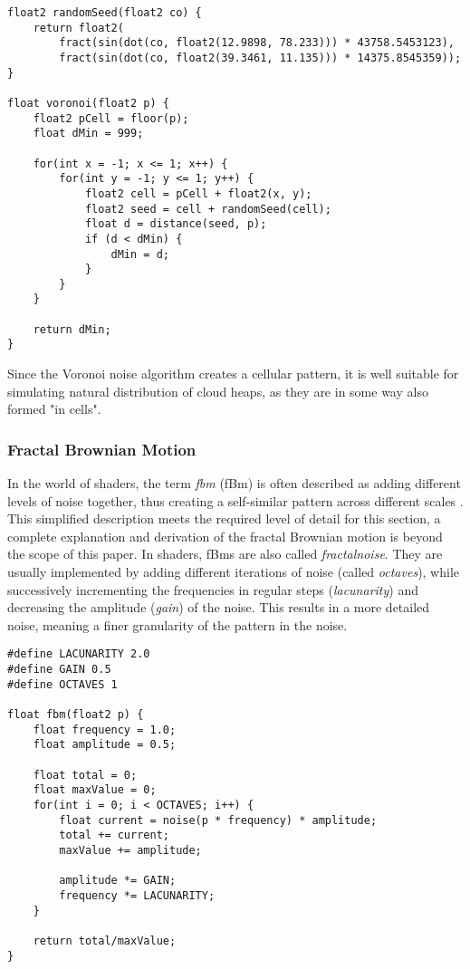 \begin{lstlisting}[language=HLSL, caption=Implementation of 2D Voronoi noise algorithm., label=lst:shader:noise:voronoi2d]
float2 randomSeed(float2 co) {
    return float2(
        fract(sin(dot(co, float2(12.9898, 78.233))) * 43758.5453123),
        fract(sin(dot(co, float2(39.3461, 11.135))) * 14375.8545359));
}

float voronoi(float2 p) {
    float2 pCell = floor(p);
    float dMin = 999;

    for(int x = -1; x <= 1; x++) {
        for(int y = -1; y <= 1; y++) {
            float2 cell = pCell + float2(x, y);
            float2 seed = cell + randomSeed(cell);
            float d = distance(seed, p);
            if (d < dMin) {
                dMin = d;
            }
        }
    }
    
    return dMin;
}
\end{lstlisting}

\noindent
Since the Voronoi noise algorithm creates a cellular pattern, it is well suitable for simulating natural distribution of cloud heaps, as they are in some way also formed "in cells".

\clearpage
\subsubsection{Fractal Brownian Motion}
In the world of shaders, the term \textit{\gls{fbm}} (fBm) is often described as adding different levels of noise together, thus creating a self-similar pattern across different scales \cite{online:thebookofshaders:fractal}.
This simplified description meets the required level of detail for this section, a complete explanation and derivation of the fractal Brownian motion is beyond the scope of this paper.
\emptyline
In shaders, fBms are also called \textit{\gls{fractalnoise}}. They are usually implemented by adding different iterations of noise (called \textit{octaves}), while successively incrementing the frequencies in regular steps (\textit{lacunarity}) and decreasing the amplitude (\textit{gain}) of the noise.
This results in a more detailed noise, meaning a finer granularity of the pattern in the noise.

\begin{lstlisting}[language=HLSL, caption=Implementation of fractal Brownian motion function., label=lst:shader:fbm]
#define LACUNARITY 2.0
#define GAIN 0.5
#define OCTAVES 1
    
float fbm(float2 p) {
    float frequency = 1.0;
    float amplitude = 0.5;
    
    float total = 0;
    float maxValue = 0;
    for(int i = 0; i < OCTAVES; i++) {
        float current = noise(p * frequency) * amplitude;
        total += current;
        maxValue += amplitude;
        
        amplitude *= GAIN;
        frequency *= LACUNARITY;
    }
    
    return total/maxValue;
}
\end{lstlisting}

